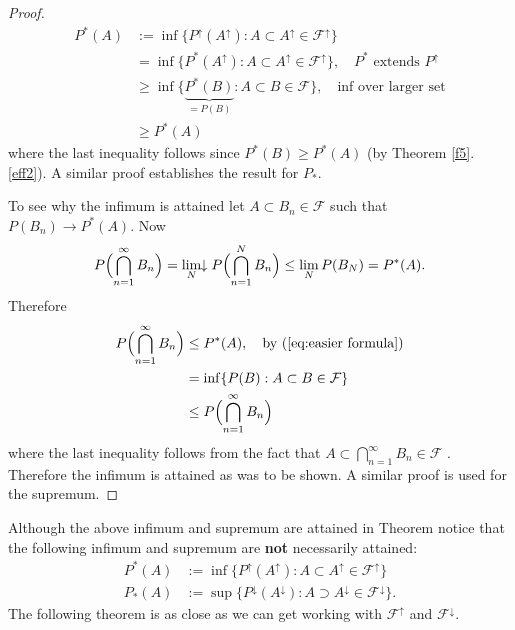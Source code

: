 \begin{proof}
\begin{align*}
P^*(A) &:= \inf\{P^\uparrow(A^\uparrow): A\subset A^\uparrow\in   \mathcal F^\uparrow   \} \\
&=   \inf\{P^*(A^\uparrow): A\subset A^\uparrow\in   \mathcal F^\uparrow   \},\quad\text{$P^*$ extends $P^\uparrow$} \\
&\geq  \inf\{\underbrace{P^*(B)}_{=P(B)}: A\subset B\in   \mathcal F  \},\quad\text{inf over larger set} \\
&\geq  P^*(A)
\end{align*}
where the last inequality follows since $P^*(B)\geq P^*(A)$ (by Theorem \ref{f5}.\ref{eff2}). A similar proof establishes the result for $P_*$.

To see why the infimum is attained let $A\subset B_n\in \mathcal F$ such that $P(B_n)\rightarrow P^*(A)$. Now
\begin{equation}
\label{eq:easier formula}
P\Bigl( \bigcap_{n=1}^\infty B_n\Bigr) = \displaystyle\lim_{N}\!\!\downarrow P\Bigl( \bigcap_{n=1}^N B_n\Bigr) \leq \lim_N P( B_N) = P^*(A).
\end{equation}
Therefore
\begin{align*}
P\Bigl( \bigcap_{n=1}^\infty B_n\Bigr)
&\leq P^*(A),\quad\text{by (\ref{eq:easier formula})}\\
&= \inf\{ P(B): A\subset B\in   \mathcal F \} \\
&\leq  P\Bigl( \bigcap_{n=1}^\infty B_n\Bigr)
\end{align*}
where the  last inequality follows from the fact that  $A\subset \bigcap_{n=1}^\infty B_n\in \mathcal F$ .
Therefore the infimum is attained as was to be shown.
A similar proof is used for the supremum.
\end{proof}

Although the above infimum and supremum are attained in Theorem \label{thm: Easier formula for $P^*$} notice that the following  infimum and supremum are {\bf not} necessarily attained:
\begin{align*}
P^*(A)&:=\inf\{P^\uparrow(A^\uparrow): A\subset A^\uparrow\in \mathcal F^\uparrow  \}\\
P_*(A)&:=\sup\{P^\downarrow(A^\downarrow): A\supset A^\downarrow\in \mathcal F^\downarrow  \}.
\end{align*}
The following theorem is as close as we can get working with $\mathcal F^\uparrow$ and $\mathcal F^\downarrow$.


